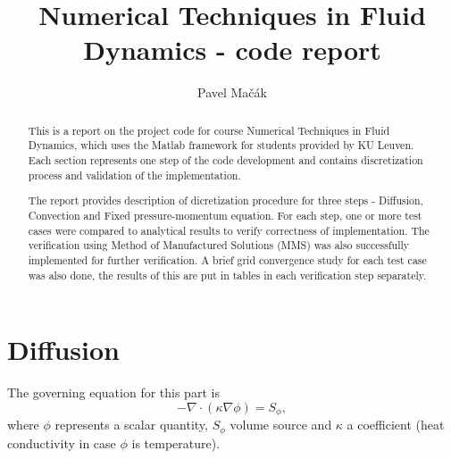 \documentclass[]{article}
\title{Numerical Techniques in Fluid Dynamics - code report}
\author{Pavel Mačák}
\begin{document}
\maketitle


\begin{abstract}
	This is a report on the project code for course Numerical Techniques in Fluid Dynamics, which uses the Matlab framework for students provided by KU Leuven. Each section represents one step of the code development and contains discretization process and validation of the implementation.
	
	The report provides description of dicretization procedure for three steps - Diffusion, Convection and Fixed pressure-momentum equation. For each step, one or more test cases were compared to analytical results to verify correctness of implementation. The verification using Method of Manufactured Solutions (MMS) was also successfully implemented for further verification. A brief grid convergence study for each test case was also done, the results of this are put in tables in each verification step separately.
\end{abstract}

\section{Diffusion}
The governing equation for this part is 
\begin{equation}\label{eq:diffusion}
	-\nabla \cdot (\kappa\nabla\phi) = S_\phi,
\end{equation}
where $ \phi $ represents a scalar quantity, $ S_\phi $ volume source and $ \kappa $ a coefficient (heat conductivity in case $ \phi $ is temperature).
\end{document}
